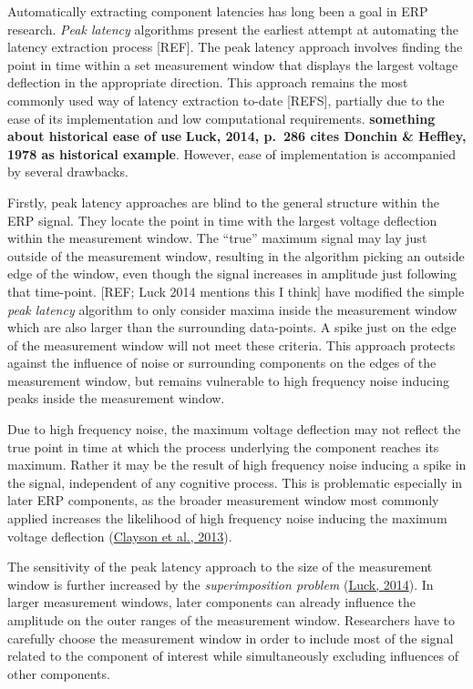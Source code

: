 \documentclass[
  man,floatsintext]{apa7}
\begin{document}
Automatically extracting component latencies has long been a goal in ERP research. \emph{Peak latency} algorithms present the earliest attempt at automating the latency extraction process {[}REF{]}. The peak latency approach involves finding the point in time within a set measurement window that displays the largest voltage deflection in the appropriate direction. This approach remains the most commonly used way of latency extraction to-date {[}REFS{]}, partially due to the ease of its implementation and low computational requirements. \textbf{something about historical ease of use} \textbf{Luck, 2014, p.~286 cites Donchin \& Heffley, 1978 as historical example}. However, ease of implementation is accompanied by several drawbacks.

Firstly, peak latency approaches are blind to the general structure within the ERP signal. They locate the point in time with the largest voltage deflection within the measurement window. The ``true'' maximum signal may lay just outside of the measurement window, resulting in the algorithm picking an outside edge of the window, even though the signal increases in amplitude just following that time-point. {[}REF; Luck 2014 mentions this I think{]} have modified the simple \emph{peak latency} algorithm to only consider maxima inside the measurement window which are also larger than the surrounding data-points. A spike just on the edge of the measurement window will not meet these criteria. This approach protects against the influence of noise or surrounding components on the edges of the measurement window, but remains vulnerable to high frequency noise inducing peaks inside the measurement window.

Due to high frequency noise, the maximum voltage deflection may not reflect the true point in time at which the process underlying the component reaches its maximum. Rather it may be the result of high frequency noise inducing a spike in the signal, independent of any cognitive process. This is problematic especially in later ERP components, as the broader measurement window most commonly applied increases the likelihood of high frequency noise inducing the maximum voltage deflection (\protect\hyperlink{ref-clayson2013noise}{Clayson et al., 2013}).

The sensitivity of the peak latency approach to the size of the measurement window is further increased by the \emph{superimposition problem} (\protect\hyperlink{ref-luck2014introduction}{Luck, 2014}). In larger measurement windows, later components can already influence the amplitude on the outer ranges of the measurement window. Researchers have to carefully choose the measurement window in order to include most of the signal related to the component of interest while simultaneously excluding influences of other components.
\end{document}
